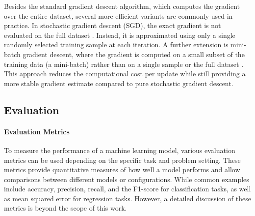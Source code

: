 Besides the standard gradient descent algorithm, which computes the gradient over the entire dataset, several more efficient variants are commonly used in practice. In stochastic gradient descent (SGD), the exact gradient is not evaluated on the full dataset \cite{Bottou2010LargeScaleML, Robbins1951ASA}. Instead, it is approximated using only a single randomly selected training sample at each iteration. A further extension is mini-batch gradient descent, where the gradient is computed on a small subset of the training data (a mini-batch) rather than on a single sample or the full dataset \cite{Bottou2016OptimizationMF, Goodfellow-et-al-2016}. This approach reduces the computational cost per update while still providing a more stable gradient estimate compared to pure stochastic gradient descent.






\subsection{Evaluation}

\paragraph{Evaluation Metrics}
To measure the performance of a machine learning model, various evaluation metrics can be used depending on the specific task and problem setting. These metrics provide quantitative measures of how well a model performs and allow comparisons between different models or configurations. While common examples include accuracy, precision, recall, and the F1-score for classification tasks, as well as mean squared error for regression tasks. However, a detailed discussion of these metrics is beyond the scope of this work.

